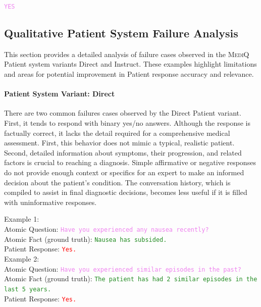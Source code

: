 \begin{tcolorbox}[title={Example LLM Output}, colframe=gray]
\small\texttt{\textcolor{violet}{YES}}\normalsize
\end{tcolorbox}


\subsection{Qualitative Patient System Failure Analysis}\label{app:patient:fail}
This section provides a detailed analysis of failure cases observed in the \textsc{MediQ} Patient system variants Direct and Instruct. These examples highlight limitations and areas for potential improvement in Patient response accuracy and relevance.

\paragraph{Patient System Variant: Direct}
There are two common failures cases observed by the Direct Patient variant. First, it tends to respond with binary yes/no answers. Although the response is factually correct, it lacks the detail required for a comprehensive medical assessment. First, this behavior does not mimic a typical, realistic patient. Second, detailed information about symptoms, their progression, and related factors is crucial to reaching a diagnosis. Simple affirmative or negative responses do not provide enough context or specifics for an expert to make an informed decision about the patient's condition. The conversation history, which is compiled to assist in final diagnostic decisions, becomes less useful if it is filled with uninformative responses.

\begin{tcolorbox}[colframe=red]
\small
Example 1:\\
Atomic Question: \texttt{\textcolor{violet}{Have you experienced any nausea recently?}}\\
Atomic Fact (ground truth): \texttt{\textcolor{forestgreen}{Nausea has subsided.}}\\
Patient Response: \texttt{\textcolor{red}{Yes.}}\\
Example 2:\\
Atomic Question: \texttt{\textcolor{violet}{Have you experienced similar episodes in the past?}}\\
Atomic Fact (ground truth): \texttt{\textcolor{forestgreen}{The patient has had 2 similar episodes in the last 5 years.}}\\
Patient Response: \texttt{\textcolor{red}{Yes.}}
\normalsize
\end{tcolorbox}


